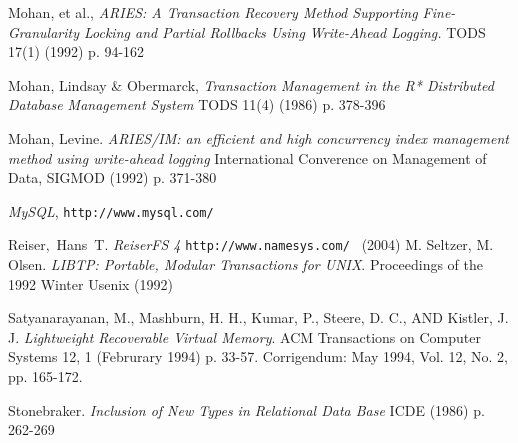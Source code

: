 \documentclass[letterpaper,english]{article}
\begin{document}
\begin{thebibliography}{99}
 Mohan, et al., {\em ARIES: A Transaction Recovery Method Supporting Fine-Granularity Locking and Partial Rollbacks Using Write-Ahead Logging.} TODS 17(1) (1992) p. 94-162

 Mohan, Lindsay \& Obermarck, {\em Transaction Management in the R* Distributed Database Management System} TODS 11(4) (1986) p. 378-396

 Mohan, Levine. {\em ARIES/IM: an efficient and high concurrency index management method using write-ahead logging} International Converence on Management of Data, SIGMOD (1992) p. 371-380

 {\em MySQL}, {\tt http://www.mysql.com/ }

 Reiser,~Hans~T. {\em ReiserFS 4} {\tt http://www.namesys.com/ } (2004)
%
 M. Seltzer, M. Olsen. {\em LIBTP: Portable, Modular Transactions for UNIX}. Proceedings of the 1992 Winter Usenix (1992)

 Satyanarayanan, M., Mashburn, H. H., Kumar, P., Steere, D. C., AND Kistler, J. J. {\em Lightweight Recoverable Virtual Memory}. ACM Transactions on Computer Systems 12, 1 (Februrary 1994) p. 33-57. Corrigendum: May 1994, Vol. 12, No. 2, pp. 165-172.

 Stonebraker. {\em Inclusion of New Types in Relational Data Base } ICDE (1986) p. 262-269

%
%


%
%
%
%
%
%
%

\end{thebibliography}
\end{document}
